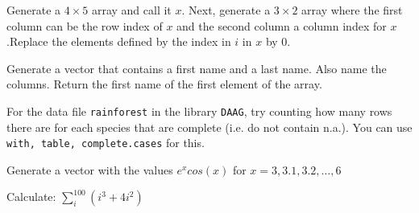 \begin{exercise}
    Generate a $4 \times 5$ array and call it $x$. Next, generate a $3 \times 2$ array where the first column can be the row index of $x$
    and the second column a column index for $x$.Replace the elements defined by the index in $i$ in $x$ by 0. 
\end{exercise}

\begin{exercise}
    Generate a vector that contains a first name and a last name. Also name the columns. Return the first name of the first element of the array.
\end{exercise}

\begin{exercise}
    For the data file \texttt{rainforest} in the library \texttt{DAAG}, try counting how many rows there are for each species that are complete (i.e. do not contain n.a.). You can use \texttt{with, table, complete.cases} for this.
\end{exercise}

\begin{exercise}
    Generate a vector with the values $e^x cos(x)$ for $x= 3, 3.1, 3.2, \dots ,6$
\end{exercise}

\begin{exercise}
    Calculate: $\sum_{i}^{100}(i^3 + 4i^2)$
\end{exercise}

